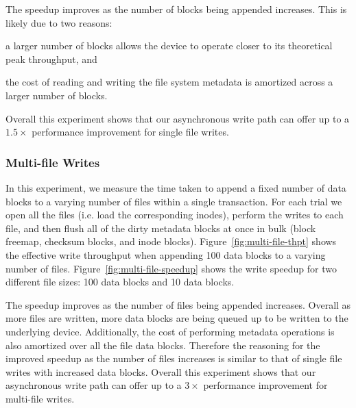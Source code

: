 The speedup improves as the number of blocks being appended increases. This is
likely due to two reasons:
\begin{enumerate*}[label={(\roman*)}]
  \item a larger number of blocks allows the device to operate closer to its
    theoretical peak throughput, and
  \item the cost of reading and writing the file system metadata is amortized
    across a larger number of blocks.
\end{enumerate*}
Overall this experiment shows that our asynchronous write path can offer up to
a $1.5\times$ performance improvement for single file writes.

\subsubsection{Multi-file Writes}
In this experiment, we measure the time taken to append a fixed number of data
blocks to a varying number of files within a single transaction. For each trial
we open all the files (i.e. load the corresponding inodes), perform the writes
to each file, and then flush all of the dirty metadata blocks at once in bulk
(block freemap, checksum blocks, and inode blocks).
Figure~\ref{fig:multi-file-thpt} shows the effective write throughput when
appending 100 data blocks to a varying number of files.
Figure~\ref{fig:multi-file-speedup} shows the write speedup for two different
file sizes: 100 data blocks and 10 data blocks.

The speedup improves as the number of files being appended increases. Overall
as more files are written, more data blocks are being queued up to be written
to the underlying device. Additionally, the cost of performing metadata
operations is also amortized over all the file data blocks. Therefore the
reasoning for the improved speedup as the number of files increases is similar
to that of single file writes with increased data blocks. Overall this
experiment shows that our asynchronous write path can offer up to a $3\times$
performance improvement for multi-file writes.
